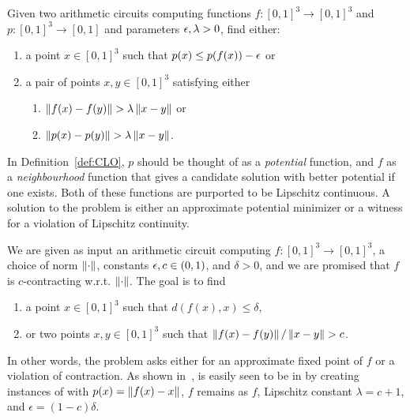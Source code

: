 \begin{definition}
\label{def:CLO}
Given two arithmetic circuits computing functions $f : [0,1]^3\to [0,1]^3$ and $p :
[0,1]^3 \to [0,1]$ and parameters $\epsilon, \lambda > 0$, find either:
\begin{enumerate}[leftmargin=*,label=(C\arabic*)]
\item a point $x\in [0,1]^3$ such that $p(x) \leq p(f(x)) - \epsilon$ or \label{c_fixpoint}
\item a pair of points $x,y\in [0,1]^3$ satisfying either \label{c_violation}
  \begin{enumerate}[label=(C\arabic{enumi}\alph*)] 
  \item $\left\| f(x) - f(y) \right\| > \lambda \left\| x-y \right\|$ or \label{c_bad_f}
  \item $\left\| p(x) - p(y) \right\| > \lambda \left\| x-y \right\|$. \label{c_bad_p}
  \end{enumerate}
\end{enumerate}
\end{definition}

In Definition~\ref{def:CLO}, $p$ should be thought of as a \emph{potential}
function, and $f$ as a \emph{neighbourhood} function that gives a candidate
solution with better potential if one exists. Both of these functions are 
purported to be Lipschitz continuous. A solution to the problem is either an approximate
potential minimizer or a witness for a violation of Lipschitz continuity.

\begin{definition} \label{def:contractionmap}
We are given as input an arithmetic circuit computing $f: [0,1]^3\to [0,1]^3$,
a choice of norm $\left\| \cdot \right\|$, constants \mbox{$\epsilon,c \in (0,1)$},
and $\delta > 0$, and we are promised that $f$ is $c$-contracting w.r.t. $\left\| \cdot \right\|$.
The goal is to find
\begin{enumerate}[label=(CM\arabic*)]
\item a point $x\in [0,1]^3$ such that $d(f(x),x) \leq \delta$, 
\item or two points $x,y\in [0,1]^3$ such that $\left\| f(x) - f(y) \right\|/\left\| x-y \right\| > c$. 
\end{enumerate}
\end{definition}

In other words, the problem asks either for an approximate fixed point of $f$ or
a violation of contraction. As shown in~\cite{daskalakis2011continuous}, \CM is
easily seen to be in \CLS by creating instances of \CLO with $p(x) =
\left\| f(x)-x \right\|$, $f$ remains as $f$, Lipschitz constant $\lambda = c+1$, and $\epsilon =
(1-c)\delta$.

